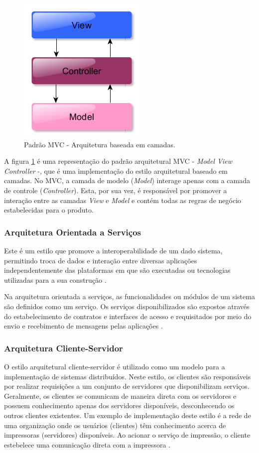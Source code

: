 \begin{figure}[htb]
\centering
\includegraphics[scale=0.5]{figuras/modelo_mvc.PNG}
\caption{Padrão MVC - Arquitetura baseada em camadas.}
\label{modelo_mvc}
\end{figure}

A figura \ref{modelo_mvc} é uma representação do padrão arquitetural MVC - \textit{Model View Controller} -, que é uma implementação do estilo arquitetural baseado em camadas. No MVC, a camada de modelo (\textit{Model}) interage apenas com a camada de controle (\textit{Controller}). Esta, por sua vez, é responsável por promover a interação entre as camadas \textit{View} e \textit{Model} e contém todas as regras de negócio estabelecidas para o produto.

\subsubsection{Arquitetura Orientada a Serviços}

Este é um estilo que promove a interoperabilidade de um dado sistema, permitindo troca de dados e interação entre diversas aplicações independentemente das plataformas em que são executadas ou tecnologias utilizadas para a sua construção \cite{oqueesoa_2010}.

Na arquitetura orientada a serviços, as funcionalidades ou módulos de um sistema são definidos como um serviço. Os serviços disponibilizados são expostos através do estabelecimento de contratos e interfaces de acesso e requisitados por meio do envio e recebimento de mensagens pelas aplicações \cite{oqueesoa_2010}.

\subsubsection{Arquitetura Cliente-Servidor}
O estilo arquitetural cliente-servidor é utilizado como um modelo para a implementação de sistemas distribuídos. Neste estilo, os clientes são responsáveis por realizar requisições a um conjunto de servidores que disponibilizam serviços. Geralmente, os clientes se comunicam de maneira direta com os servidores e possuem conhecimento apenas dos servidores disponíveis, desconhecendo os outros clientes existentes. Um exemplo de implementação deste estilo é a rede de uma organização onde os usuários (clientes) têm conhecimento acerca de impressoras (servidores) disponíveis. Ao acionar o serviço de impressão, o cliente estebelece uma comunicação direta com a impressora \cite{sommerville2008engenharia}.

